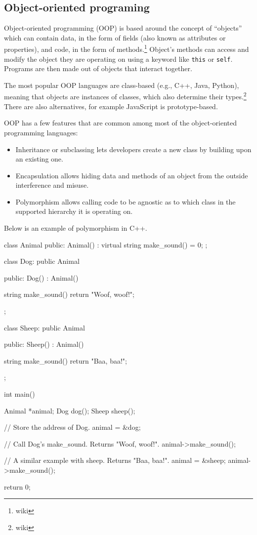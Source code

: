 \subsection{Object-oriented programing}
Object-oriented programming (OOP) is based around the concept of ``objects'' which can contain data, in the form of fields (also known as attributes or properties),
and code, in the form of methods.\footnote{wiki} Object's methods can access and modify the object they are operating on using a keyword like \texttt{this}
or \texttt{self}.
Programs are then made out of objects that interact together.

The most popular OOP languages are class-based (e.g., C++, Java, Python), meaning that objects are instances of classes, which also determine their types.\footnote{wiki}
There are also alternatives, for example JavaScript is prototype-based.

OOP has a few features that are common among most of the object-oriented programming languages:
\begin{itemize}
    \item Inheritance or subclassing lets developers create a new class by building upon an existing one.
    \item Encapsulation allows hiding data and methods of an object from the outside interference and misuse.
    \item Polymorphism allows calling code to be agnostic as to which class in the supported hierarchy it is operating on.
\end{itemize}

Below is an example of polymorphism in C++.
\begin{code}
class Animal {
public:
    Animal() : { }
    virtual string make_sound() = 0;
};

class Dog: public Animal {
public:
    Dog() : Animal() { }
      
    string make_sound() { 
        return "Woof, woof!"; 
    }
};

class Sheep: public Animal {
public:
    Sheep() : Animal() { }
      
    string make_sound() { 
        return "Baa, baa!"; 
    }
};

int main() {
    Animal *animal;
    Dog dog();
    Sheep sheep();

    // Store the address of Dog.
    animal = &dog;

    // Call Dog's make_sound. Returns "Woof, woof!".
    animal->make_sound();

    // A similar example with sheep. Returns "Baa, baa!".
    animal = &sheep;
    animal->make_sound();

    return 0;
}
\end{code}


